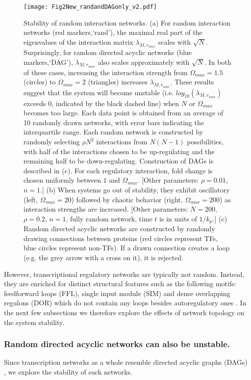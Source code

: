 \documentclass[10pt]{article}
\begin{document}
\begin{figure}[ht]
    \centering
	\texttt{[image: Fig2New\_randandDAGonly\_v2.pdf]}
    \caption{Stability of random interaction networks. (a) For random interaction networks (red markers,`rand'), the maximal real part of the eigenvalues of the interaction matrix $\lambda_{M,r_{max}}$ scales with $\sqrt{N}$. Surprisingly, for random directed acyclic networks (blue markers,`DAG'), $\lambda_{M,r_{max}}$ also scales approximately with $\sqrt{N}$. In both of these cases, increasing the interaction strength from $\Omega_{max}=1.5$ (circles) to $\Omega_{max}=2$ (triangles) increases $\lambda_{M,r_{max}}$. These results suggest that the system will become unstable (i.e. $log_{10}(\lambda_{M,r_{max}})$ exceeds 0, indicated by the black dashed line) when $N$ or $\Omega_{max}$ becomes too large. Each data point is obtained from an average of 10 randomly drawn networks, with error bars indicating the interquartile range. Each random network is constructed by randomly selecting $\rho N^2$ interactions from $N(N-1)$ possibilities, with half of the interactions chosen to be up-regulating and the remaining half to be down-regulating. Construction of DAGs is described in (c). For each regulatory interaction, fold change is chosen uniformly between $1$ and $\Omega_{max}$.  [Other parameters: $\rho = 0.01$, $n = 1$.] (b) When systems go out of stability, they exhibit oscillatory (left, $\Omega_{max} = 20$) followed by chaotic behavior (right, $\Omega_{max} = 200$) as interaction strengths are increased. [Other parameters: $N=200$, $\rho = 0.2$, $n = 1$, fully random network, time $t$ is in units of $1/k_p$.] (c) Random directed acyclic networks are constructed by randomly drawing connections between proteins (red circles represent TFs, blue circles represent non-TFs). If a drawn connection creates a loop (e.g. the grey arrow with a cross on it), it is rejected. }
    \label{fig:Stability_randomnetworks}
\end{figure}

However, transcriptional regulatory networks are typically not random. Instead, they are enriched for distinct structural features such as the following motifs: feedforward loops (FFL), single input module (SIM) and dense overlapping regulons (DOR) which do not contain any loops besides autoregulatory ones \cite{alon2019introduction,shen2002network}. In the next few subsections we therefore explore the effects of network topology on the system stability.

\subsubsection*{Random directed acyclic networks can also be unstable.}
Since transcription networks as a whole resemble directed acyclic graphs (DAGs) \cite{shen2002network, alon2019introduction}, we explore the stability of such networks. 
\end{document}
